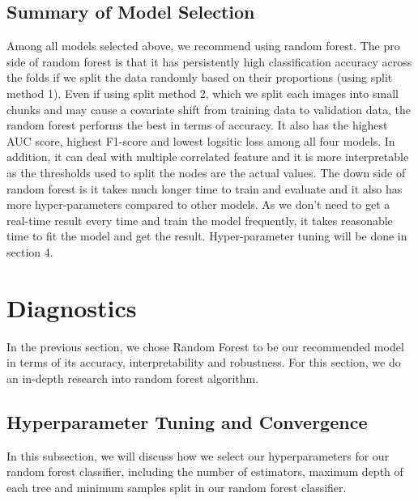 \documentclass[letterpaper,11pt]{article}
\begin{document}
\subsection{Summary of Model Selection}
Among all models selected above, we recommend using random forest. The pro side of random forest is that it has persistently high classification accuracy across the folds if we split the data randomly based on their proportions (using split method 1). Even if using split method 2, which we split each images into small chunks and may cause a covariate shift from training data to validation data, the random forest  performs the best in terms of accuracy. It also has the highest AUC score, highest F1-score and lowest logsitic loss among all four models. In addition, it can deal with multiple correlated feature and it is more interpretable as the thresholds used to split the nodes are the actual values. The down side of random forest is it takes much longer time to train and evaluate and it also has more hyper-parameters compared to other models. As we don't need to get a real-time result every time and train the model frequently, it takes reasonable time to fit the model and get the result. Hyper-parameter tuning will be done in section 4.

\section{Diagnostics}
In the previous section, we chose Random Forest to be our recommended model in terms of its accuracy, interpretability and robustness. For this section, we do an in-depth research into random forest algorithm.

\subsection{Hyperparameter Tuning and Convergence}
In this subsection, we will discuss how we select our hyperparameters for our random forest classifier, including the number of estimators, maximum depth of each tree and minimum samples split in our random forest classifier. 
\end{document}
